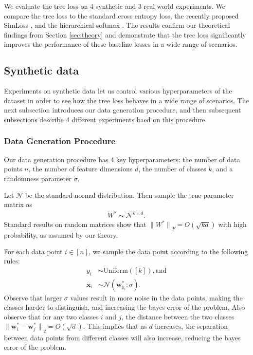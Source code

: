 \documentclass[twoside]{article}
\renewcommand{\star}[1]{{#1}^{*}}
\newcommand{\w}{\mathbf w}
\newcommand{\x}{\mathbf x}
\newcommand{\ltwo}[1]{{\lVert {#1} \rVert}_2}
\newcommand{\lF}[1]{{\lVert {#1} \rVert}_F}
\begin{document}
We evaluate the tree loss on 4 synthetic and 3 real world experiments.
We compare the tree loss to the standard cross entropy loss, the recently proposed SimLoss \citep{Kobs2020SimLossCS}, and the hierarchical softmax \citep{morin2005hierarchical}.
The results confirm our theoretical findings from Section \ref{sec:theory} and demonstrate that the tree loss significantly improves the performance of these baseline losses in a wide range of scenarios.

\subsection{Synthetic data}

Experiments on synthetic data let us control various hyperparameters of the dataset in order to see how the tree loss behaves in a wide range of scenarios.
The next subsection introduces our data generation procedure,
and then subsequent subsections describe 4 different experiments baed on this procedure.

\subsubsection{Data Generation Procedure}
\label{sec:exp:synth:problem}

Our data generation procedure has 4 key hyperparameters:
the number of data points $n$, the number of feature dimensions $d$, the number of classes $k$, and a randomness parameter $\sigma$.

Let $\mathcal N$ be the standard normal distribution.
Then sample the true parameter matrix as
\begin{align}
    \star W \sim \mathcal N^{k\times d}
    .
\end{align}
Standard results on random matrices show that $\lF{\star W} = O(\sqrt{kd})$ with high probability, as assumed by our theory.

For each data point $i\in[n]$,
we sample the data point according to the following rules:
\begin{align}
    y_i &\sim \text{Uniform}([k]), \text{and} \\
    \x_{i} &\sim \mathcal N(\w^*_{y_i}; \sigma).
\end{align}
Observe that larger $\sigma$ values result in
more noise in the data points,
making the classes harder to distinguish,
and increasing the bayes error of the problem.
Also observe that for any two classes $i$ and $j$,
the distance between the two classes $\ltwo{\star\w_i - \star\w_j} = O(\sqrt{d})$.
This implies that as $d$ increases,
the separation between data points from different classes will also increase,
reducing the bayes error of the problem.
\end{document}
